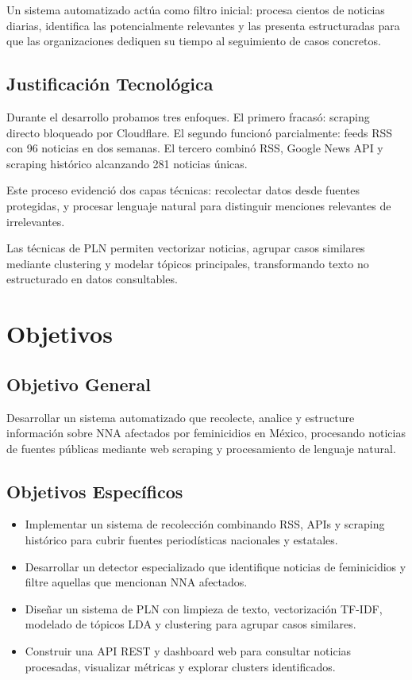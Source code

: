 Un sistema automatizado actúa como filtro inicial: procesa cientos de noticias diarias, identifica las potencialmente relevantes y las presenta estructuradas para que las organizaciones dediquen su tiempo al seguimiento de casos concretos.

\subsection{Justificación Tecnológica}
Durante el desarrollo probamos tres enfoques. El primero fracasó: scraping directo bloqueado por Cloudflare. El segundo funcionó parcialmente: feeds RSS con 96 noticias en dos semanas. El tercero combinó RSS, Google News API y scraping histórico alcanzando 281 noticias únicas.

Este proceso evidenció dos capas técnicas: recolectar datos desde fuentes protegidas, y procesar lenguaje natural para distinguir menciones relevantes de irrelevantes.

Las técnicas de PLN permiten vectorizar noticias, agrupar casos similares mediante clustering y modelar tópicos principales, transformando texto no estructurado en datos consultables.

\section{Objetivos}
\label{sec:objetivos}

\subsection{Objetivo General}
Desarrollar un sistema automatizado que recolecte, analice y estructure información sobre NNA afectados por feminicidios en México, procesando noticias de fuentes públicas mediante web scraping y procesamiento de lenguaje natural.

\subsection{Objetivos Específicos}
\begin{itemize}
    \item Implementar un sistema de recolección combinando RSS, APIs y scraping histórico para cubrir fuentes periodísticas nacionales y estatales.
    
    \item Desarrollar un detector especializado que identifique noticias de feminicidios y filtre aquellas que mencionan NNA afectados.
    
    \item Diseñar un sistema de PLN con limpieza de texto, vectorización TF-IDF, modelado de tópicos LDA y clustering para agrupar casos similares.
    
    \item Construir una API REST y dashboard web para consultar noticias procesadas, visualizar métricas y explorar clusters identificados.
\end{itemize}

